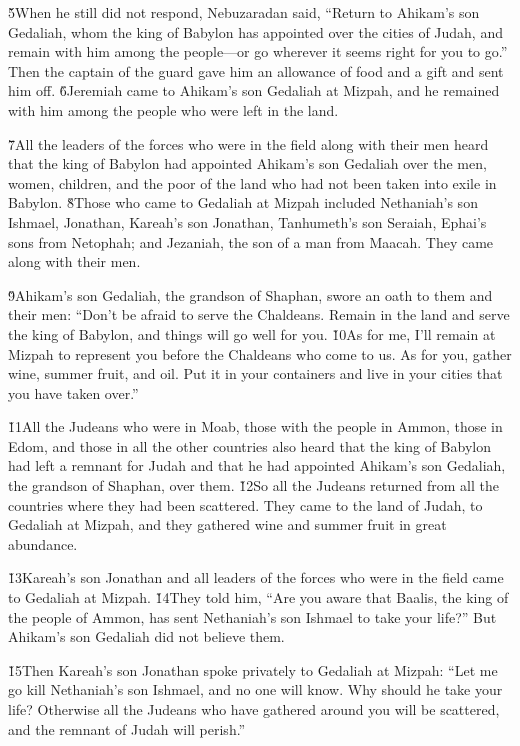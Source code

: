 \v{5}When he still did not respond, Nebuzaradan said, ``Return to Ahikam's son Gedaliah, whom the king of Babylon has appointed over the cities of Judah, and remain with him among the people---or go wherever it seems right for you to go.'' Then the captain of the guard gave him an allowance of food and a gift and sent him off. \v{6}Jeremiah came to Ahikam's son Gedaliah at Mizpah, and he remained with him among the people who were left in the land.

\v{7}All the leaders of the forces who were in the field along with their men heard that the king of Babylon had appointed Ahikam's son Gedaliah over the men, women, children, and the poor of the land who had not been taken into exile in Babylon. \v{8}Those who came to Gedaliah at Mizpah included Nethaniah's son Ishmael, Jonathan, Kareah's son Jonathan, Tanhumeth's son Seraiah, Ephai's sons from Netophah; and Jezaniah, the son of a man from Maacah. They came along with their men.

\v{9}Ahikam's son Gedaliah, the grandson of Shaphan, swore an oath to them and their men: ``Don't be afraid to serve the Chaldeans. Remain in the land and serve the king of Babylon, and things will go well for you. \v{10}As for me, I'll remain at Mizpah to represent you before the Chaldeans who come to us. As for you, gather wine, summer fruit, and oil. Put it in your containers and live in your cities that you have taken over.''

\v{11}All the Judeans who were in Moab, those with the people in Ammon, those in Edom, and those in all the other countries also heard that the king of Babylon had left a remnant for Judah and that he had appointed Ahikam's son Gedaliah, the grandson of Shaphan, over them. \v{12}So all the Judeans returned from all the countries where they had been scattered. They came to the land of Judah, to Gedaliah at Mizpah, and they gathered wine and summer fruit in great abundance.

\v{13}Kareah's son Jonathan and all leaders of the forces who were in the field came to Gedaliah at Mizpah. \v{14}They told him, ``Are you aware that Baalis, the king of the people of Ammon, has sent Nethaniah's son Ishmael to take your life?'' But Ahikam's son Gedaliah did not believe them.

\v{15}Then Kareah's son Jonathan spoke privately to Gedaliah at Mizpah: ``Let me go kill Nethaniah's son Ishmael, and no one will know. Why should he take your life? Otherwise all the Judeans who have gathered around you will be scattered, and the remnant of Judah will perish.''

